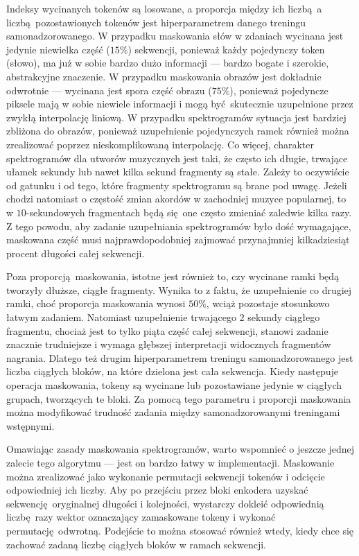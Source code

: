 Indeksy wycinanych tokenów są losowane, a proporcja między ich liczbą a liczbą pozostawionych tokenów jest hiperparametrem danego treningu samonadzorowanego. W przypadku maskowania słów w zdaniach \cite{devlin_bert_2019} wycinana jest jedynie niewielka część ($15\%$) sekwencji, ponieważ każdy pojedynczy token (słowo), ma już w sobie bardzo dużo informacji --- bardzo bogate i szerokie, abstrakcyjne znaczenie. W przypadku maskowania obrazów \cite{he_masked_2021} jest dokładnie odwrotnie --- wycinana jest spora część obrazu ($75\%$), ponieważ pojedyncze piksele mają w sobie niewiele informacji i mogą być skutecznie uzupełnione przez zwykłą interpolację liniową. W przypadku spektrogramów sytuacja jest bardziej zbliżona do obrazów, ponieważ uzupełnienie pojedynczych ramek również można zrealizować poprzez nieskomplikowaną interpolację. Co więcej, charakter spektrogramów dla utworów muzycznych jest taki, że często ich długie, trwające ułamek sekundy lub nawet kilka sekund fragmenty są stałe. Zależy to oczywiście od gatunku i od tego, które fragmenty spektrogramu są brane pod uwagę. Jeżeli chodzi natomiast o częstość zmian akordów w zachodniej muzyce popularnej, to w $10$-sekundowych fragmentach będą się one często zmieniać zaledwie kilka razy. Z tego powodu, aby zadanie uzupełniania spektrogramów było dość wymagające, maskowana część musi najprawdopodobniej zajmować przynajmniej kilkadziesiąt procent długości całej sekwencji.

Poza proporcją maskowania, istotne jest również to, czy wycinane ramki będą tworzyły dłuższe, ciągłe fragmenty. Wynika to z faktu, że uzupełnienie co drugiej ramki, choć proporcja maskowania wynosi $50\%$, wciąż pozostaje stosunkowo łatwym zadaniem. Natomiast uzupełnienie trwającego $2$ sekundy ciągłego fragmentu, chociaż jest to tylko piąta część całej sekwencji, stanowi zadanie znacznie trudniejsze i wymaga głębszej interpretacji widocznych fragmentów nagrania. Dlatego też drugim hiperparametrem treningu samonadzorowanego jest liczba ciągłych bloków, na które dzielona jest cała sekwencja. Kiedy następuje operacja maskowania, tokeny są wycinane lub pozostawiane jedynie w ciągłych grupach, tworzących te bloki. Za pomocą tego parametru i proporcji maskowania można modyfikować trudność zadania między samonadzorowanymi treningami wstępnymi.

Omawiając zasady maskowania spektrogramów, warto wspomnieć o jeszcze jednej zalecie tego algorytmu --- jest on bardzo łatwy w implementacji. Maskowanie można zrealizować jako wykonanie permutacji sekwencji tokenów i odcięcie odpowiedniej ich liczby. Aby po przejściu przez bloki enkodera uzyskać sekwencję oryginalnej długości i kolejności, wystarczy dokleić odpowiednią liczbę razy wektor oznaczający zamaskowane tokeny i wykonać permutację odwrotną. Podejście to można stosować również wtedy, kiedy chce się zachować zadaną liczbę ciągłych bloków w ramach sekwencji.

